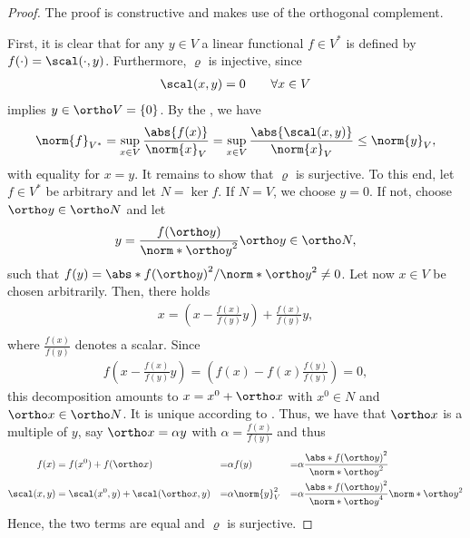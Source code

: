 \begin{proof}
  The proof is constructive and makes use of the orthogonal
  complement.

  First, it is clear that for any $y\in V$ a linear functional
  $f\in V^*$ is defined by $f(\cdot) = \scal(\cdot,y)$. Furthermore,
  $\varrho$ is injective, since
  \begin{gather*}
    \scal(x,y) = 0 \qquad\forall x\in V
  \end{gather*}
  implies $y\in \ortho V = \{0\}$. By the
  , we have
  \begin{gather*}
    \norm{f}_{V^*} = \sup_{x\in V}\frac{\abs{f(x)}}{\norm{x}_V}
    = \sup_{x\in V}\frac{\abs{\scal(x,y)}}{\norm{x}_V}
      \le \norm{y}_V,
  \end{gather*}
  with equality for $x=y$.  It remains to show that $\varrho$ is
  surjective. To this end, let $f\in V^*$ be arbitrary and let
  $N = \ker f$. If $N=V$, we choose $y=0$. If not, choose
  $\ortho y \in \ortho N$ and let
  \begin{gather}
    \label{eq:lafa:13}
    y = \frac{f(\ortho y)}{\norm*{\ortho y}^2} \ortho y \in
    \ortho N,
  \end{gather}
  such that $f(y) = \abs*{f(\ortho y)}^2/\norm*{\ortho y}^2 \neq 0$.
  Let now $x\in V$ be chosen arbitrarily. Then, there holds
  \begin{gather*}
    x = \left(x-\frac{f(x)}{f(y)} y\right)
    + \frac{f(x)}{f(y)} y,
    \\
  \end{gather*}
  where $\frac{f(x)}{f(y)}$ denotes a scalar.
  Since
  \begin{gather*}
      f \left(x-\frac{f(x)}{f(y)} y\right) 
      = \left(f(x)-f(x) \frac{f(y)}{f(y)}\right)
      = 0,
  \end{gather*}
  this decomposition amounts to $x = x^0+\ortho x$ with $x^0\in N$ and
  $\ortho x \in \ortho N$. It is unique according to
  . Thus, we have that $\ortho x$ is a
  multiple of $y$, say $\ortho x=\alpha y$ with $\alpha=\frac{f(x)}{f(y)}$ and thus
  \begin{gather*}
    \begin{aligned}
    f(x) &= f(x^0) + f(\ortho x)
    &=& \alpha f(y)
    &=& \alpha \frac{\abs*{f(\ortho y)}^2}{\norm*{\ortho y}^2}
    \\
    \scal(x,y) &= \scal(x^0,y)  + \scal(\ortho x,y)
    &=& \alpha \norm{y}_V^2
    &=& \alpha \frac{\abs*{f(\ortho y)}^2}{\norm*{\ortho y}^4}
    \norm*{\ortho y}^2
    \end{aligned}
  \end{gather*}
  Hence, the two terms are equal and $\varrho$ is surjective.
\end{proof}

